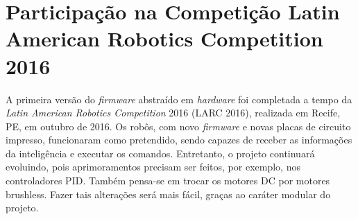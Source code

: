 \chapter{Participação na Competição Latin American Robotics Competition 2016}\label{cap:larc_2016}

A primeira versão do \textit{firmware} abstraído em \textit{hardware} foi completada a tempo da \textit{Latin American Robotics Competition} 2016 (LARC 2016), realizada em Recife, PE, em outubro de 2016. Os robôs, com novo \textit{firmware} e novas placas de circuito impresso, funcionaram como pretendido, sendo capazes de receber as informações da inteligência e executar os comandos. Entretanto, o projeto continuará evoluindo, pois aprimoramentos precisam ser feitos, por exemplo, nos controladores PID. Também pensa-se em trocar os motores DC por motores brushless. Fazer tais alterações será mais fácil, graças ao caráter modular do projeto.



